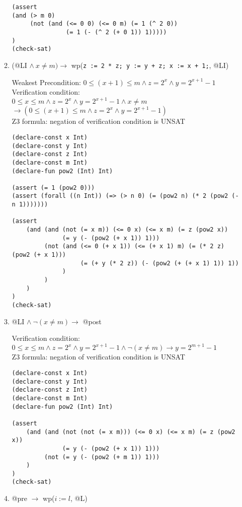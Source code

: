 \documentclass{article}
\begin{document}
\begin{enumerate}
\begin{enumerate}[(1)]
\begin{verbatim}
(assert 
(and (> m 0) 
     (not (and (<= 0 0) (<= 0 m) (= 1 (^ 2 0))
               (= 1 (- (^ 2 (+ 0 1)) 1)))))
)
(check-sat)
\end{verbatim}

\item (@LI $\land\ x \neq m) \to$ wp(\verb|z := 2 * z; y := y + z; x := x + 1;|, @LI)

        Weakest Precondition: $0 \leq (x + 1) \leq m \land z = 2^x \land y = 2^{x + 1} - 1$ \\
        Verification condition:\\
        $0 \leq x \leq m \land z = 2^x \land y = 2^{x + 1} - 1 \land x \neq m$ \\
        $\to (0 \leq (x + 1) \leq m \land z = 2^x \land y = 2^{x + 1} - 1)$ \\
        Z3 formula: negation of verification condition is UNSAT
\begin{verbatim}
(declare-const x Int)
(declare-const y Int)
(declare-const z Int)
(declare-const m Int)
(declare-fun pow2 (Int) Int)

(assert (= 1 (pow2 0)))
(assert (forall ((n Int)) (=> (> n 0) (= (pow2 n) (* 2 (pow2 (- n 1)))))))

(assert
    (and (and (not (= x m)) (<= 0 x) (<= x m) (= z (pow2 x))
              (= y (- (pow2 (+ x 1)) 1)))
         (not (and (<= 0 (+ x 1)) (<= (+ x 1) m) (= (* 2 z) (pow2 (+ x 1)))
                   (= (+ y (* 2 z)) (- (pow2 (+ (+ x 1) 1)) 1))
              )
         )
    )
)
(check-sat)
\end{verbatim}

\item @LI $\land\ \neg(x\neq m) \to$ @post

        Verification condition:\\
        $0 \leq x \leq m \land z = 2^x \land y = 2^{x + 1} - 1 \land \neg(x \neq m) \to y = 2^{m+1} - 1$\\
        Z3 formula: negation of verification condition is UNSAT
\begin{verbatim}
(declare-const x Int)
(declare-const y Int)
(declare-const z Int)
(declare-const m Int)
(declare-fun pow2 (Int) Int)

(assert
    (and (and (not (not (= x m))) (<= 0 x) (<= x m) (= z (pow2 x))
              (= y (- (pow2 (+ x 1)) 1)))
         (not (= y (- (pow2 (+ m 1)) 1)))
    )
)
(check-sat)
\end{verbatim}

\item @pre $\to$ wp($i := l$, @L)


\end{enumerate}
\end{enumerate}
\end{document}
